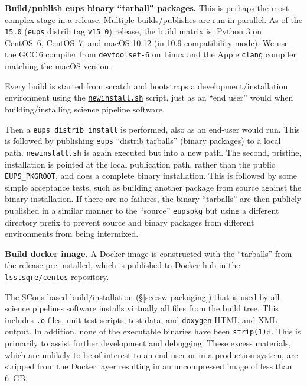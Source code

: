 \noindent \textbf{Build/publish eups binary ``tarball'' packages.}
This is perhaps the most complex stage in a release.  Multiple builds/publishes
are run in parallel.  As of the \texttt{15.0} (\texttt{eups} distrib tag
\texttt{v15\_0}) release, the build matrix is: Python 3 on CentOS~6, CentOS~7, and macOS 10.12 (in 10.9 compatibility mode).
We use the GCC\,6 compiler from \texttt{devtoolset-6} on Linux and the Apple \texttt{clang} compiler matching the macOS version.

Every build is started from scratch and bootstraps a development/installation environment using the \href{https://github.com/lsst/lsst/blob/master/scripts/newinstall.sh}{\texttt{new\-install.sh}}\cite{pipelines-guide} script, just as an ``end user'' would when building/installing science pipeline software.

Then a \texttt{eups distrib install} is performed, also as an end-user would
run.  This is followed by publishing \texttt{eups} ``distrib tarballs'' (binary
packages) to a local path.  \texttt{newinstall.sh} is again executed but into a
new path.  The second, pristine, installation is pointed at the local publication
path, rather than the public \texttt{EUPS\_PKGROOT}, and does a complete binary
installation.  This is followed by some simple acceptance tests, such as
building another package from source against the binary installation.  If there
are no failures, the binary ``tarballs'' are then publicly published in a
similar manner to the ``source'' \texttt{eupspkg} but using a different
directory prefix to prevent source and binary packages from different
environments from being intermixed.

\noindent \textbf{Build docker image.}
A \href{https://github.com/lsst-sqre/docker-tarballs}{Docker image} is
constructed with the ``tarballs'' from the release pre-installed, which is
published to Docker hub in the
\href{https://hub.docker.com/r/lsstsqre/centos/}{\texttt{lsstsqre/centos}} repository.

The SCons-based build/installation (\S\ref{sec:sw-packaging}) that is used by all science pipelines software installs
virtually all files from the build tree. This includes \texttt{.o} files, unit
test scripts, test data, and \texttt{doxygen} HTML and XML output. In
addition, none of the executable binaries have been \texttt{strip(1)}d.  This is primarily to assist further development and debugging.  These
excess materials, which are unlikely to be of interest to an end user or in a
production system,
are stripped from the Docker layer resulting in an uncompressed image of less than 6~GB.

